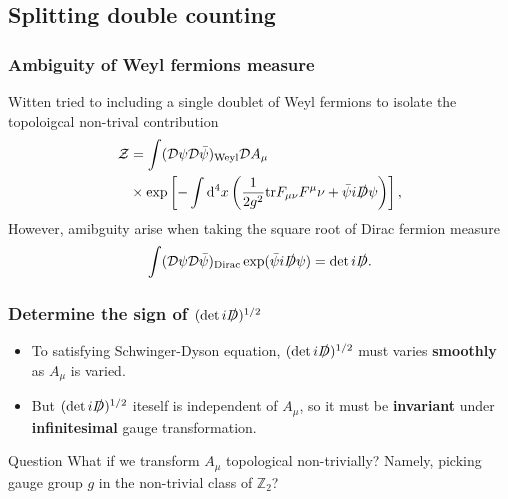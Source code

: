\documentclass[10pt,aspectratio=43,xcolor=x11names]{beamer}%
\begin{document}
	\subsection{Splitting double counting}
		\begin{frame}
			\frametitle{Ambiguity of Weyl fermions measure}
			Witten tried to including a single doublet of Weyl fermions to isolate the topoloigcal non-trival contribution
			\begin{align*}
				\mathcal{Z}&=\int(\mathcal{D}\psi\mathcal{D}\bar{\psi})_{\text{Weyl}}\mathcal{D}A_\mu\\
				&\times\exp \left[-\int\mathop{}\!\mathrm{d}^4x \left(\dfrac{1}{2g^2}\mathrm{tr}F_{\mu\nu}F^\mu\nu+\bar{\psi}i\slashed{D}\psi\right) \right],
			\end{align*}
			\pause
			However, amibguity arise when taking the square root of Dirac fermion measure
			\begin{equation*}
				\int(\mathcal{D}\psi\mathcal{D}\bar{\psi})_{\text{Dirac}}\exp(\bar{\psi} i\slashed{D}\psi)=\mathrm{det}\,i\slashed{D}.
			\end{equation*}


		\end{frame}
		\begin{frame}
			\frametitle{Determine the sign of $(\mathrm{det}\,i\slashed{D})^{1/2}$}
			\begin{itemize}
				\item To satisfying Schwinger-Dyson equation, $(\mathrm{det}\,i\slashed{D})^{1/2}$ must varies \textbf{smoothly} as $A_\mu$ is varied.\pause
				\item But $(\mathrm{det}\,i\slashed{D})^{1/2}$ iteself is independent of $A_\mu$, so it must be \textbf{invariant} under \textbf{infinitesimal} gauge transformation.\pause
			\end{itemize}
			\begin{redblock}{Question}
				What if we transform $A_\mu$ topological non-trivially? Namely, picking gauge group $g$ in the non-trivial class of $\mathbb{Z}_2$?
			\end{redblock}
		\end{frame}
\end{document}
